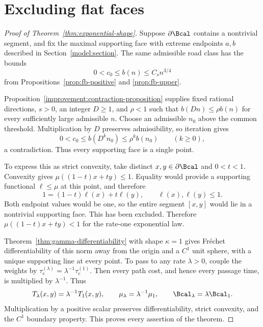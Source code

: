 \section{Excluding flat faces}
\label{conclusion:section}

\begin{proof}[Proof of Theorem~\ref{thm:exponential-shape}]
Suppose $\partial\Bcal$ contains a nontrivial segment, and fix the
maximal supporting face with extreme endpoints $a,b$ described in
Section~\ref{model:section}. The same admissible road class has the
bounds
\[
 0<c_0\le b(n)\le C_s n^{3/4}
\]
from Propositions~\ref{prop:fb-positive} and \ref{prop:fb-upper}.

Proposition~\ref{improvement:contraction-proposition} supplies fixed
rational directions, $s>0$, an integer $D\ge1$, and $\rho<1$ such that
$b(Dn)\le\rho b(n)$ for every sufficiently large admissible $n$.
Choose an admissible $n_0$ above the common threshold. Multiplication
by $D$ preserves admissibility, so iteration gives
\[
 0<c_0\le b(D^k n_0)\le\rho^k b(n_0)
 \qquad(k\ge0),
\]
a contradiction. Thus every supporting face is a single point.

To express this as strict convexity, take distinct
$x,y\in\partial\Bcal$ and $0<t<1$. Convexity gives
$\mu((1-t)x+ty)\le1$. Equality would provide a supporting functional
$\ell\le\mu$ at this point, and therefore
\[
 1=(1-t)\ell(x)+t\ell(y),\qquad \ell(x),\ell(y)\le1.
\]
Both endpoint values would be one, so the entire segment $[x,y]$
would lie in a nontrivial supporting face. This has been excluded.
Therefore $\mu((1-t)x+ty)<1$ for the rate-one exponential law.

Theorem~\ref{thm:gamma-differentiability} with shape $\kappa=1$
gives Fr\'echet differentiability of this norm away from the origin and
a $C^1$ unit sphere, with a unique supporting line at every point.
To pass to any rate $\lambda>0$, couple the weights by
$\tau_e^{(\lambda)}=\lambda^{-1}\tau_e^{(1)}$. Then every path cost,
and hence every passage time, is multiplied by $\lambda^{-1}$. Thus
\[
 T_\lambda(x,y)=\lambda^{-1}T_1(x,y),\qquad
 \mu_\lambda=\lambda^{-1}\mu_1,\qquad
 \Bcal_\lambda=\lambda\Bcal_1.
\]
Multiplication by a positive scalar preserves differentiability,
strict convexity, and the $C^1$ boundary property. This proves every
assertion of the theorem.
\end{proof}

